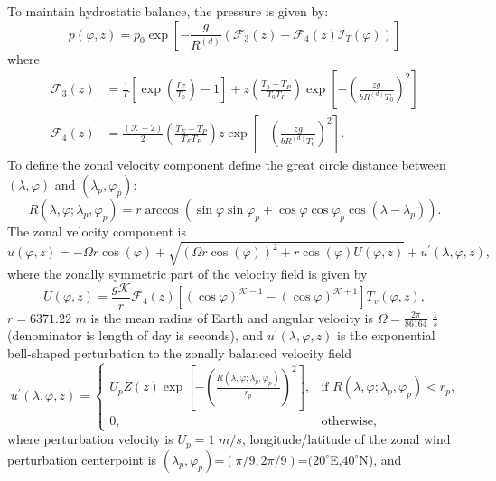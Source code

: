\documentclass{agujournal}
\begin{document}
{To maintain hydrostatic balance, the pressure is given by:
\begin{equation}
p(\varphi, z) = p_0\exp \left[ -\frac{g}{R^{(d)}}(\mathcal{F}_{3}(z) -\mathcal{F}_{4}(z) \mathcal{I}_T(\varphi) ) \right]\label{eq:baroPmoist}
\end{equation} where
\begin{align}
\mathcal{F}_{3}(z) &=\frac{1}{\Gamma} \left[ \exp\left( \frac{\Gamma z}{T_0} \right)-1 \right] + z \left(\frac{T_0-T_P}{T_0T_P} \right) \exp\left[-\left(\frac{z g}{b R^{(d)} T_0}\right)^2\right] \\
\mathcal{F}_{4}(z) &=\frac{({\mathcal{K}}+2)}{2} \left(\frac{T_E-T_P}{T_E T_P} \right) z \exp\left[-\left(\frac{z g}{b R^{(d)} T_0}\right)^2\right].
\end{align}    
To define the zonal velocity component define the great circle distance between $(\lambda,\varphi)$ and $(\lambda_p,\varphi_p)$:
\begin{equation}
R(\lambda, \varphi; \lambda_p, \varphi_p) = r \arccos \left( \sin \varphi \sin \varphi_p + \cos \varphi \cos \varphi_p \cos (\lambda - \lambda_p) \right).
\end{equation}
The zonal velocity component is
\begin{equation}
u(\varphi, z) = -\Omega r \cos(\varphi)+\sqrt{(\Omega r\cos(\varphi))^2+ r\cos(\varphi)U(\varphi,z)}+u^\prime(\lambda, \varphi, z),
\end{equation} where the zonally symmetric part of the velocity field is given by
\begin{equation}
U(\varphi,z) = \frac{g {\mathcal{K}}}{r} \mathcal{F}_{4}(z) \left[ (\cos \varphi)^{{\mathcal{K}} - 1} - (\cos \varphi)^{{\mathcal{K}} + 1} \right] T_v(\varphi, z),
\end{equation} 
$r=6371.22$ $m$ is the mean radius of Earth and angular velocity is $\Omega=\frac{2\pi}{86164}$ $\frac{1}{s}$ (denominator is length of day is seconds), and $u^\prime(\lambda, \varphi, z)$ is the exponential bell-shaped perturbation to the zonally balanced velocity field
\begin{equation}
u^\prime(\lambda, \varphi, z) = \left\{ \begin{array}{ll} U_p Z(z)  \exp \left[ - \left( \frac{R(\lambda, \varphi; \lambda_p, \varphi_p)}{r_p} \right)^2 \right], & \mbox{if $R(\lambda, \varphi; \lambda_p, \varphi_p) < r_p$,} \\ 0, & \mbox{otherwise,} \end{array} \right.
\end{equation} where perturbation velocity is $U_p=1$ $m/s$, longitude/latitude of the zonal wind perturbation centerpoint is $(\lambda_p,\varphi_p)$=$(\pi/9,2\pi/9)$=$(20^{\circ}$E,$40^{\circ}$N),  and
}
\end{document}
